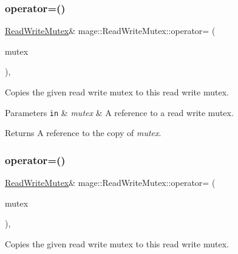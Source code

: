 \subsubsection{\texorpdfstring{operator=()}{operator=()}\hspace{0.1cm}{\footnotesize\ttfamily [1/2]}}
{\footnotesize\ttfamily \hyperlink{classmage_1_1_read_write_mutex}{Read\+Write\+Mutex}\& mage\+::\+Read\+Write\+Mutex\+::operator= (\begin{DoxyParamCaption}\item[{const \hyperlink{classmage_1_1_read_write_mutex}{Read\+Write\+Mutex} \&}]{mutex }\end{DoxyParamCaption})\hspace{0.3cm}{\ttfamily [private]}, {\ttfamily [delete]}}

Copies the given read write mutex to this read write mutex.


\begin{DoxyParams}[1]{Parameters}
\mbox{\tt in}  & {\em mutex} & A reference to a read write mutex. \\
\hline
\end{DoxyParams}
\begin{DoxyReturn}{Returns}
A reference to the copy of {\itshape mutex}. 
\end{DoxyReturn}
\hypertarget{classmage_1_1_read_write_mutex_a14ea4d1be75046741a7663e0d86a017a}{}\label{classmage_1_1_read_write_mutex_a14ea4d1be75046741a7663e0d86a017a} 
\subsubsection{\texorpdfstring{operator=()}{operator=()}\hspace{0.1cm}{\footnotesize\ttfamily [2/2]}}
{\footnotesize\ttfamily \hyperlink{classmage_1_1_read_write_mutex}{Read\+Write\+Mutex}\& mage\+::\+Read\+Write\+Mutex\+::operator= (\begin{DoxyParamCaption}\item[{\hyperlink{classmage_1_1_read_write_mutex}{Read\+Write\+Mutex} \&\&}]{mutex }\end{DoxyParamCaption})\hspace{0.3cm}{\ttfamily [private]}, {\ttfamily [delete]}}

Copies the given read write mutex to this read write mutex.


